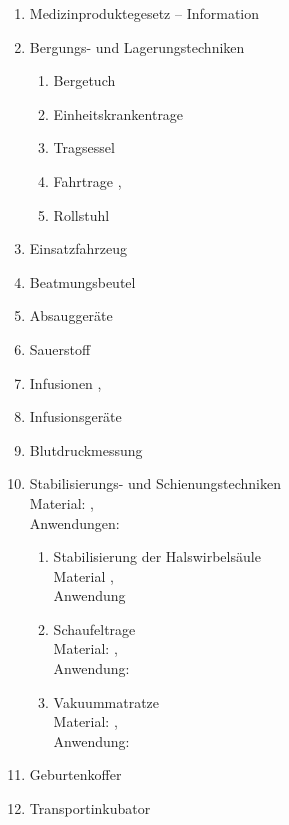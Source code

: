  \begin{enumerate}\item
    
    Medizinproduktegesetz -- Information \dotfill {}
    \item    Bergungs- und Lagerungstechniken
    \begin{enumerate}
      \item      Bergetuch \dotfill  {}
      \item      Einheitskrankentrage \dotfill {}
      \item      Tragsessel \dotfill {}
      \item      Fahrtrage \dotfill {},
      \item      Rollstuhl \dotfill {} %
    \end{enumerate}
    \item    Einsatzfahrzeug \dotfill {}
    \item    Beatmungsbeutel \dotfill {}
    \item    Absauggeräte \dotfill {}
    \item    Sauerstoff \dotfill {}
    \item    Infusionen  \dotfill {}, 
    \item    Infusionsgeräte \dotfill {}
    \item    Blutdruckmessung \dotfill {}
    \item    Stabilisierungs- und Schienungstechniken\\
    Material:  \dotfill {}, \\
    Anwendungen:  \dotfill {}
    \begin{enumerate}
      \item      Stabilisierung der Halswirbelsäule
      \\
      Material  \dotfill {}, \\
      Anwendung  \dotfill {}
      \item      Schaufeltrage
      \\
      Material:  \dotfill {},
      \\Anwendung:  \dotfill {}
      \item      Vakuummatratze
      \\
      Material:  \dotfill {},
      \\Anwendung: \dotfill
    \end{enumerate}
    \item    Geburtenkoffer \dotfill {}
    \item    Transportinkubator \dotfill {}
  \end{enumerate}
